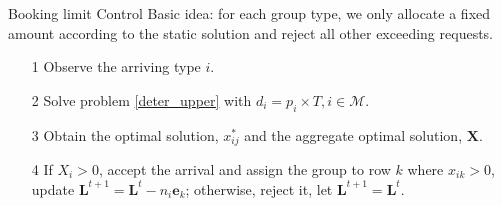       \begin{frame}{Booking limit Control}
        Basic idea: for each group type, we only allocate a fixed amount according to the static solution and reject all other exceeding requests.
        \begin{itemize}
          \item[1] Observe the arriving type $i$.
          \item[2] Solve problem \eqref{deter_upper} with $d_{i} = p_{i} \times T, i \in \mathcal{M}$.
          \item[3] Obtain the optimal solution, $x_{ij}^{*}$ and the aggregate optimal solution, $\mathbf{X}$.
          \item[4] If $X_{i} > 0$, accept the arrival and assign the group to row $k$ where $x_{ik} > 0$, update $\mathbf{L}^{t+1} = \mathbf{L}^{t} - n_i \mathbf{e}_{k}$; otherwise, reject it, let $\mathbf{L}^{t+1} = \mathbf{L}^{t}$.
        \end{itemize}
                 
      \end{frame}
      